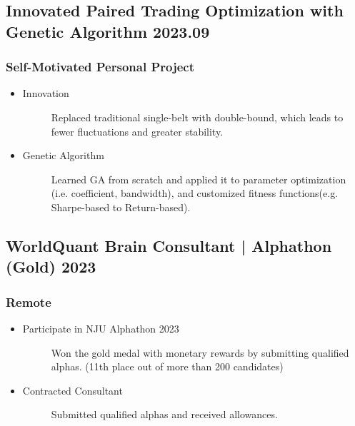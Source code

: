 \documentclass[a4paper]{article}
\begin{document}
\subsection{Innovated Paired Trading Optimization with Genetic Algorithm \normalfont \hfill 2023.09}
\subsubsection{Self-Motivated Personal Project}
\begin{itemize}
    \item\begin{description}
        \item[Innovation] Replaced traditional single-belt with double-bound, which leads to fewer fluctuations and greater stability.
    \end{description}
    \item\begin{description}
        \item[Genetic Algorithm] Learned GA from scratch and applied it to parameter optimization (i.e. coefficient, bandwidth), and customized fitness functions(e.g. Sharpe-based to Return-based).
    \end{description}
\end{itemize}

\subsection{WorldQuant Brain Consultant | Alphathon (Gold) \normalfont  \hfill 2023}
\subsubsection{Remote}
\begin{itemize}
    \item\begin{description}
        \item[Participate in NJU Alphathon 2023] Won the gold medal with monetary rewards by submitting qualified alphas. (11th place out of more than 200 candidates)
    \end{description}
    \item\begin{description}
        \item[Contracted Consultant] Submitted qualified alphas and received allowances. 
    \end{description}
\end{itemize}  
\end{document}
